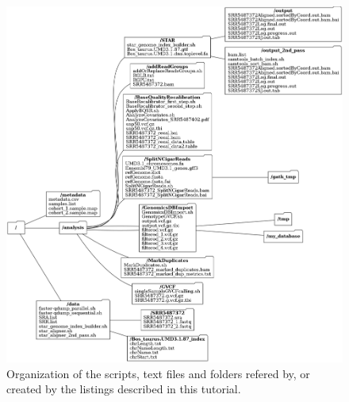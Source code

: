 \begin{figure}
\begin{center}

\includegraphics[width=1\textwidth]{misc/tree.png}
\caption[caption] {Organization of the scripts, text files and folders refered by, or created by the listings described in this tutorial.}

\end{center}
\end{figure}


